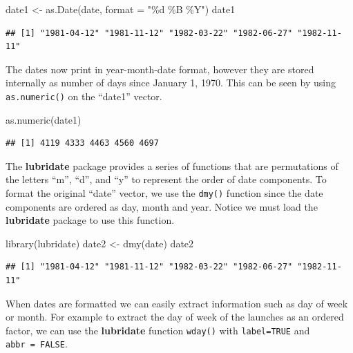 \documentclass[
]{book}
\newenvironment{Shaded}{\begin{snugshade}}{\end{snugshade}}
\newcommand{\AttributeTok}[1]{\textcolor[rgb]{0.77,0.63,0.00}{#1}}
\newcommand{\FunctionTok}[1]{\textcolor[rgb]{0.00,0.00,0.00}{#1}}
\newcommand{\NormalTok}[1]{#1}
\newcommand{\OtherTok}[1]{\textcolor[rgb]{0.56,0.35,0.01}{#1}}
\newcommand{\StringTok}[1]{\textcolor[rgb]{0.31,0.60,0.02}{#1}}
\begin{document}
\begin{Shaded}
\begin{Highlighting}[]
\NormalTok{date1 }\OtherTok{\textless{}{-}} \FunctionTok{as.Date}\NormalTok{(date, }\AttributeTok{format =} \StringTok{"\%d \%B \%Y"}\NormalTok{)}
\NormalTok{date1}
\end{Highlighting}
\end{Shaded}

\begin{verbatim}
## [1] "1981-04-12" "1981-11-12" "1982-03-22" "1982-06-27" "1982-11-11"
\end{verbatim}

The dates now print in year-month-date format, however they are stored internally as number of days since January 1, 1970. This can be seen by using \texttt{as.numeric()} on the ``date1'' vector.

\begin{Shaded}
\begin{Highlighting}[]
\FunctionTok{as.numeric}\NormalTok{(date1)}
\end{Highlighting}
\end{Shaded}

\begin{verbatim}
## [1] 4119 4333 4463 4560 4697
\end{verbatim}

The \textbf{lubridate} package provides a series of functions that are permutations of the letters ``m'', ``d'', and ``y'' to represent the order of date components. To format the original ``date'' vector, we use the \texttt{dmy()} function since the date components are ordered as day, month and year. Notice we must load the \textbf{lubridate} package to use this function.

\begin{Shaded}
\begin{Highlighting}[]
\FunctionTok{library}\NormalTok{(lubridate)}
\NormalTok{date2 }\OtherTok{\textless{}{-}} \FunctionTok{dmy}\NormalTok{(date)}
\NormalTok{date2}
\end{Highlighting}
\end{Shaded}

\begin{verbatim}
## [1] "1981-04-12" "1981-11-12" "1982-03-22" "1982-06-27" "1982-11-11"
\end{verbatim}

When dates are formatted we can easily extract information such as day of week or month. For example to extract the day of week of the launches as an ordered factor, we can use the \textbf{lubridate} function \texttt{wday()} with \texttt{label=TRUE} and \texttt{abbr\ =\ FALSE}.
\end{document}
